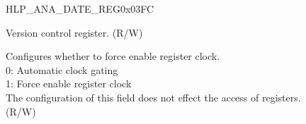 \begin{register}{H}{LP\_ANA\_DATE\_REG}{0x03FC}\label{regdesc:LPANADATEREG}
%
%
\regnewline%
\begin{regdesc}\begin{reglist}
\label{fielddesc:LPANALPANADATE}\item [LP\_ANA\_LP\_ANA\_DATE] Version control register. (R/W)
\label{fielddesc:LPANACLKEN}\item [LP\_ANA\_CLK\_EN] Configures whether to force enable register clock.\\
0: Automatic clock gating\\
1: Force enable register clock\\
The configuration of this field does not effect the access of registers.\\
(R/W)
\end{reglist}\end{regdesc}
\end{register}

